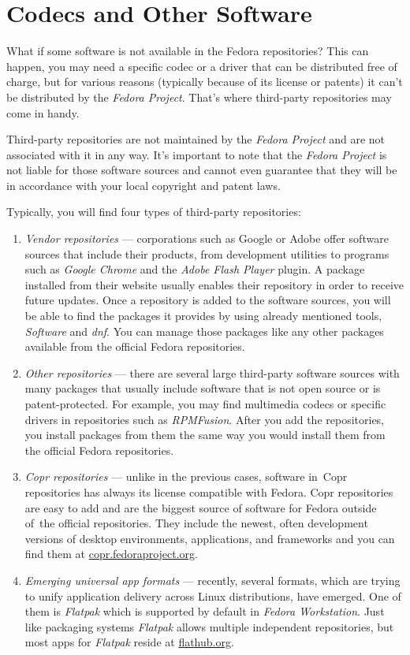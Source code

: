 \section*{Codecs and Other Software}

What if some software is not available in the Fedora repositories? This can happen, you may need a specific codec or a driver that can be distributed free of charge, but for various reasons (typically because of its license or patents) it can't be distributed by the \emph{Fedora Project}. That's where third-party repositories may come in handy.

Third-party repositories are not maintained by the \emph{Fedora Project} and are not associated with it in any way. It's important to note that the \emph{Fedora Project} is not liable for those software sources and cannot even guarantee that they will be in accordance with your local copyright and patent laws.

Typically, you will find four types of third-party repositories:
\begin{enumerate}
\item\emph{Vendor repositories} --- corporations such as Google or Adobe offer software sources that include their products, from development utilities to programs such as \emph{Google Chrome} and the \emph{Adobe Flash Player} plugin. A package installed from their website usually enables their repository in order to receive future updates. Once a repository is added to the software sources, you will be able to find the packages it provides by using already mentioned tools, \emph{Software} and \emph{dnf}. You can manage those packages like any other packages available from the official Fedora repositories.

\item\emph{Other repositories} --- there are several large third-party software sources with many packages that usually include software that is not open source or is patent-protected. For example, you may find multimedia codecs or specific drivers in repositories such as \emph{RPMFusion}. After you add the repositories, you install packages from them the same way you would install them from the official Fedora repositories.

\item\emph{Copr repositories} --- unlike in the previous cases, software in~Copr repositories has always its license compatible with Fedora. Copr repositories are easy to add and are the biggest source of software for Fedora outside of~the official repositories. They include the newest, often development versions of desktop environments, applications, and frameworks and you can find them at \url{copr.fedoraproject.org}.

\item\emph{Emerging universal app formats} --- recently, several formats, which are trying to unify application delivery across Linux distributions, have emerged. One of them is \emph{Flatpak} which is supported by default in \emph{Fedora Workstation}. Just like packaging systems \emph{Flatpak} allows multiple independent repositories, but most apps for \emph{Flatpak} reside at \url{flathub.org}.
\end{enumerate}


